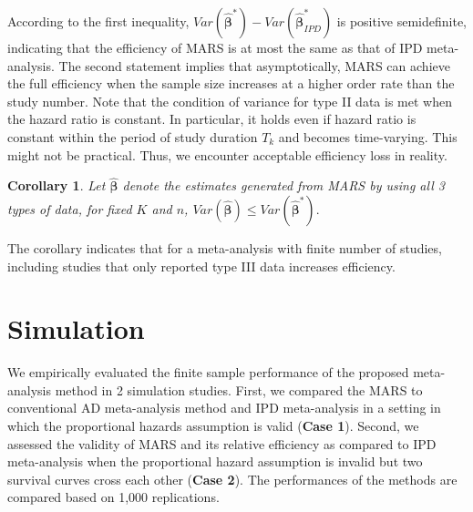 \documentclass[12pt]{article}
\theoremstyle{mystyle}
\newtheorem*{corollary}{Corollary}
\begin{document}
According to the first inequality, $Var(\hat{\boldsymbol\beta}^*)- Var(\hat{\boldsymbol\beta}^*_{IPD})$ is positive semidefinite, indicating that the efficiency of MARS is at most the same as that of IPD meta-analysis. The second statement implies that asymptotically, MARS can achieve the full efficiency when the sample size increases at a higher order rate than the study number. Note that the condition of variance for type II data is met when the hazard ratio is constant. In particular, it holds even if hazard ratio is constant within the period of study duration $T_k$ and becomes time-varying. This might not be practical. Thus, we encounter acceptable efficiency loss in reality. 

\begin{corollary}
Let $\hat{\boldsymbol\beta}$ denote the estimates generated from MARS by using all 3 types of data, for fixed $K$ and $n$, $Var(\hat{\boldsymbol\beta})\leq Var(\hat{\boldsymbol\beta}^*).$
\end{corollary}

The corollary indicates that for a meta-analysis with finite number of studies, including studies that only reported type III data increases efficiency.



\section{\label{sec:5} Simulation}

We empirically evaluated the finite sample performance of the proposed meta-analysis method in 2 simulation studies.  First, we compared the MARS to conventional AD meta-analysis method and IPD meta-analysis in a setting in which the proportional hazards assumption is valid (\textbf{Case 1}). Second, we assessed the validity of MARS and its relative efficiency as compared to IPD meta-analysis when the proportional hazard assumption is invalid but two survival curves cross each other (\textbf{Case 2}). 
The performances of the methods are compared based on 1,000 replications.
\end{document}

